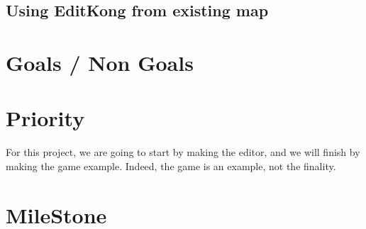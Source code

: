 \subsection{Using EditKong from existing map}

\section{Goals / Non Goals}
\section{Priority}
For this project, we are going to start by making the editor, and we will finish by making the game example. Indeed, the game is an example, not the finality.
\section{MileStone}
